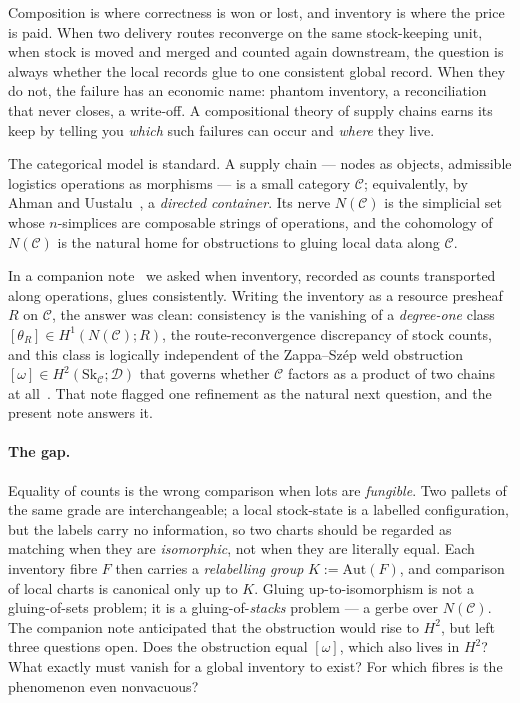 \documentclass[11pt]{article}
\theoremstyle{definition}
\newcommand{\C}{\mathcal{C}}
\newcommand{\Sk}{\mathrm{Sk}}
\newcommand{\Aut}{\mathrm{Aut}}
\newcommand{\Dfr}{\mathcal{D}}
\begin{document}
Composition is where correctness is won or lost, and inventory is where the price is paid. When
two delivery routes reconverge on the same stock-keeping unit, when stock is moved and merged
and counted again downstream, the question is always whether the local records glue to one
consistent global record. When they do not, the failure has an economic name: phantom
inventory, a reconciliation that never closes, a write-off. A compositional theory of supply
chains earns its keep by telling you \emph{which} such failures can occur and \emph{where} they
live.

The categorical model is standard. A supply chain --- nodes as objects, admissible logistics
operations as morphisms --- is a small category $\C$; equivalently, by Ahman and
Uustalu~\cite{au-dccat}, a \emph{directed container}. Its nerve $N(\C)$ is the simplicial set
whose $n$-simplices are composable strings of operations, and the cohomology of $N(\C)$ is the
natural home for obstructions to gluing local data along $\C$.

In a companion note~\cite{h1note} we asked when inventory, recorded as counts transported along
operations, glues consistently. Writing the inventory as a resource presheaf $R$ on $\C$, the
answer was clean: consistency is the vanishing of a \emph{degree-one} class
$[\theta_R]\in H^1(N(\C);R)$, the route-reconvergence discrepancy of stock counts, and this
class is logically independent of the Zappa--Sz\'ep weld obstruction $[\omega]\in H^2(\Sk_\C;
\Dfr)$ that governs whether $\C$ factors as a product of two chains at all~\cite{gobstr,orch}.
That note flagged one refinement as the natural next question, and the present note answers it.

\paragraph{The gap.}
Equality of counts is the wrong comparison when lots are \emph{fungible}. Two pallets of the
same grade are interchangeable; a local stock-state is a labelled configuration, but the labels
carry no information, so two charts should be regarded as matching when they are
\emph{isomorphic}, not when they are literally equal. Each inventory fibre $F$ then carries a
\emph{relabelling group} $K:=\Aut(F)$, and comparison of local charts is canonical only up to
$K$. Gluing up-to-isomorphism is not a gluing-of-sets problem; it is a gluing-of-\emph{stacks}
problem --- a gerbe over $N(\C)$. The companion note anticipated that the obstruction would rise
to $H^2$, but left three questions open. Does the obstruction equal $[\omega]$, which also lives
in $H^2$? What exactly must vanish for a global inventory to exist? For which fibres is the
phenomenon even nonvacuous?
\end{document}
